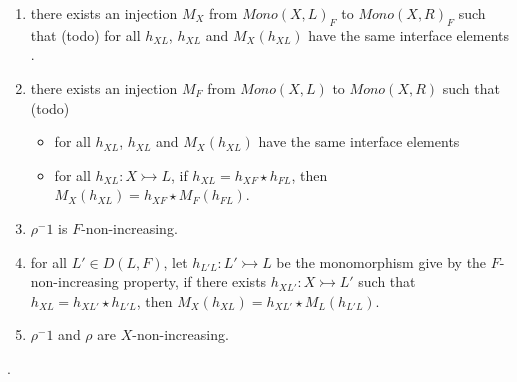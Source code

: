 \begin{enumerate}[label=(\alph*)]
    \item \label{hyp:inj_mono_x_l_to_r} there exists an injection $M_X$ from $Mono(X,L)_F$ to $Mono(X,R)_F$ such that (todo) for all $h_{XL}$, $h_{XL}$ and $M_X(h_{XL})$ have the same interface elements .
    \item \label{hyp:inj_mono_f_l_to_r} there exists an injection $M_F$ from $Mono(X,L)$ to $Mono(X,R)$ such that (todo)
    \begin{itemize}
        \item for all $h_{XL}$, $h_{XL}$ and $M_X(h_{XL})$ have the same interface elements
        \item for all $h_{XL}:X \rightarrowtail L$, if $h_{XL} \mathop{=} h_{XF} \mathop{\star} h_{FL}$, then $M_X(h_{XL}) \mathop{=} h_{XF} \mathop{\star} M_F(h_{FL})$.
    \end{itemize}  
    \item \label{hyp:f_non_increasing} $\rho^-1$ is $F$-non-increasing.
    \item \label{hyp:f_implicitly_destroyed} for all $L' \mathop{\in} D(L,F)$, let $h_{L'L}:L' \rightarrowtail L$ be the monomorphism give by the $F$-non-increasing property, if there exists $h_{XL'}:X \rightarrowtail L'$ such that $h_{XL} \mathop{=} h_{XL'} \mathop{\star} h_{L'L}$, then $M_X(h_{XL}) \mathop{=} h_{XL'} \mathop{\star} M_L(h_{L'L})$.
    \item $\rho^-1$ and $\rho$ are $X$-non-increasing.
\end{enumerate}.

